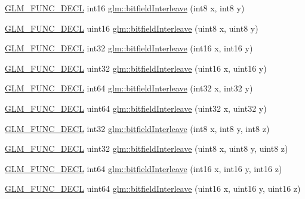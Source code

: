 \begin{DoxyCompactItemize}
\item 
\hyperlink{setup_8hpp_ab2d052de21a70539923e9bcbf6e83a51}{G\+L\+M\+\_\+\+F\+U\+N\+C\+\_\+\+D\+E\+CL} int16 \hyperlink{group__gtx__bit_ga479134317bc95d99f2b2e235d3db287b}{glm\+::bitfield\+Interleave} (int8 x, int8 y)
\item 
\hyperlink{setup_8hpp_ab2d052de21a70539923e9bcbf6e83a51}{G\+L\+M\+\_\+\+F\+U\+N\+C\+\_\+\+D\+E\+CL} uint16 \hyperlink{group__gtx__bit_ga0700a3ceb088a0ecc23d76c154096061}{glm\+::bitfield\+Interleave} (uint8 x, uint8 y)
\item 
\hyperlink{setup_8hpp_ab2d052de21a70539923e9bcbf6e83a51}{G\+L\+M\+\_\+\+F\+U\+N\+C\+\_\+\+D\+E\+CL} int32 \hyperlink{group__gtx__bit_ga1a0264598647ae00a596865af4e1e878}{glm\+::bitfield\+Interleave} (int16 x, int16 y)
\item 
\hyperlink{setup_8hpp_ab2d052de21a70539923e9bcbf6e83a51}{G\+L\+M\+\_\+\+F\+U\+N\+C\+\_\+\+D\+E\+CL} uint32 \hyperlink{group__gtx__bit_ga19ef8360379483e3ee245e89cb62ff93}{glm\+::bitfield\+Interleave} (uint16 x, uint16 y)
\item 
\hyperlink{setup_8hpp_ab2d052de21a70539923e9bcbf6e83a51}{G\+L\+M\+\_\+\+F\+U\+N\+C\+\_\+\+D\+E\+CL} int64 \hyperlink{group__gtx__bit_ga0de51d5985e6a703f305a5a61479babd}{glm\+::bitfield\+Interleave} (int32 x, int32 y)
\item 
\hyperlink{setup_8hpp_ab2d052de21a70539923e9bcbf6e83a51}{G\+L\+M\+\_\+\+F\+U\+N\+C\+\_\+\+D\+E\+CL} uint64 \hyperlink{group__gtx__bit_ga2bc87fd66f6f8471c1a46888360cef12}{glm\+::bitfield\+Interleave} (uint32 x, uint32 y)
\item 
\hyperlink{setup_8hpp_ab2d052de21a70539923e9bcbf6e83a51}{G\+L\+M\+\_\+\+F\+U\+N\+C\+\_\+\+D\+E\+CL} int32 \hyperlink{group__gtx__bit_ga6dee2ce1c45805063bb7fc5f6fd8f5ca}{glm\+::bitfield\+Interleave} (int8 x, int8 y, int8 z)
\item 
\hyperlink{setup_8hpp_ab2d052de21a70539923e9bcbf6e83a51}{G\+L\+M\+\_\+\+F\+U\+N\+C\+\_\+\+D\+E\+CL} uint32 \hyperlink{group__gtx__bit_gab9d593a2e916beb8f8137a0dbeae3afe}{glm\+::bitfield\+Interleave} (uint8 x, uint8 y, uint8 z)
\item 
\hyperlink{setup_8hpp_ab2d052de21a70539923e9bcbf6e83a51}{G\+L\+M\+\_\+\+F\+U\+N\+C\+\_\+\+D\+E\+CL} int64 \hyperlink{group__gtx__bit_gaf898f842ac089fcc8d6201c32702584a}{glm\+::bitfield\+Interleave} (int16 x, int16 y, int16 z)
\item 
\hyperlink{setup_8hpp_ab2d052de21a70539923e9bcbf6e83a51}{G\+L\+M\+\_\+\+F\+U\+N\+C\+\_\+\+D\+E\+CL} uint64 \hyperlink{group__gtx__bit_ga3c170e2ec54f2faab5e1c5bb693d718d}{glm\+::bitfield\+Interleave} (uint16 x, uint16 y, uint16 z)

\end{DoxyCompactItemize}
